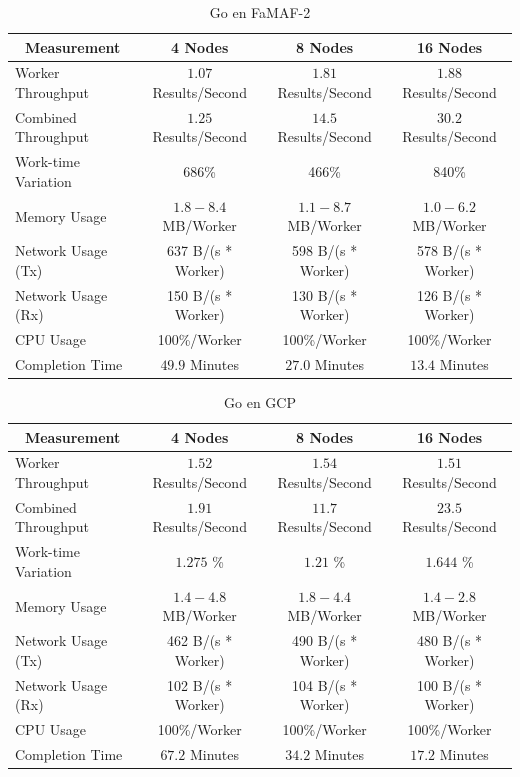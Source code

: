 \documentclass[11pt]{article}
\begin{document}
\begin{table}[H]
\centering
\begin{tabular}{|l|c|c|c|}
\hline
\multicolumn{1}{|c|}{Measurement} & 4 Nodes & 8 Nodes & 16 Nodes \\ \hline
Worker Throughput & $1.07$ Results/Second & $1.81$ Results/Second & $1.88$ Results/Second \\ \hline
Combined Throughput & $1.25$ Results/Second & $14.5$ Results/Second & $30.2$ Results/Second \\ \hline
Work-time Variation & 686\% & 466\% & 840\% \\ \hline
Memory Usage & $1.8-8.4$ MB/Worker & $1.1-8.7$ MB/Worker & $1.0-6.2$ MB/Worker \\ \hline
Network Usage (Tx) & 637 B/(s * Worker) & 598 B/(s * Worker) & 578 B/(s * Worker) \\ \hline
Network Usage (Rx) & 150 B/(s * Worker) & 130 B/(s * Worker) & 126 B/(s * Worker) \\ \hline
CPU Usage & 100\%/Worker & 100\%/Worker & 100\%/Worker \\ \hline
Completion Time & $49.9$ Minutes & $27.0$ Minutes & $13.4$ Minutes \\ \hline
\end{tabular}
\caption{Go en FaMAF-2}
\end{table}

\begin{table}[H]
\centering
\begin{tabular}{|l|c|c|c|}
\hline
\multicolumn{1}{|c|}{Measurement} & 4 Nodes & 8 Nodes & 16 Nodes \\ \hline
Worker Throughput & $1.52$ Results/Second & $1.54$ Results/Second & $1.51$ Results/Second \\ \hline
Combined Throughput & $1.91$ Results/Second & $11.7$ Results/Second & $23.5$ Results/Second \\ \hline
Work-time Variation & $1.275$ \% & $1.21$ \% & $1.644$ \% \\ \hline
Memory Usage & $1.4-4.8$ MB/Worker & $1.8-4.4$ MB/Worker & $1.4-2.8$ MB/Worker \\ \hline
Network Usage (Tx) & 462 B/(s * Worker) & 490 B/(s * Worker) & 480 B/(s * Worker) \\ \hline
Network Usage (Rx) & 102 B/(s * Worker) & 104 B/(s * Worker) & 100 B/(s * Worker) \\ \hline
CPU Usage & 100\%/Worker & 100\%/Worker & 100\%/Worker \\ \hline
Completion Time & $67.2$ Minutes & $34.2$ Minutes & $17.2$ Minutes \\ \hline
\end{tabular}
\caption{Go en GCP}
\end{table}
\end{document}
